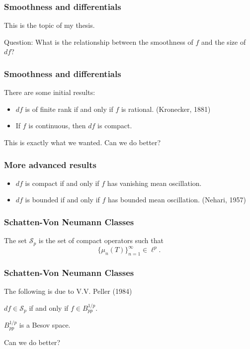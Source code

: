 \documentclass{beamer}
\begin{document}
\begin{frame}
\frametitle{Smoothness and differentials}
This is the topic of my thesis.
\begin{block}
    {Question:}
    What is the relationship between the smoothness of $f$
    and the size of $df$?    
\end{block}
\end{frame}

\begin{frame}
\frametitle{Smoothness and differentials}
There are some initial results:
\begin{itemize}
    \item{} $df$ is of finite rank if and only if $f$ is rational. (Kronecker, 1881)
    \item{} If $f$ is continuous, then $df$ is compact.
\end{itemize}
This is exactly what we wanted. Can we do better?
\end{frame}

\begin{frame}
\frametitle{More advanced results}
\begin{itemize}
    \item{} $df$ is compact if and only if $f$ has vanishing mean oscillation.
    \item{} $df$ is bounded if and only if $f$ has bounded mean oscillation. (Nehari, 1957)
\end{itemize}
\end{frame}

\begin{frame}
\frametitle{Schatten-Von Neumann Classes}
\begin{definition}
    The set $\mathcal{S}_p$ is the set of compact operators such that
    \begin{equation*}
        \{\mu_n(T)\}_{n=1}^\infty \in \ell^p.
    \end{equation*}
\end{definition}
\end{frame}

\begin{frame}
\frametitle{Schatten-Von Neumann Classes}
The following is due to V.V. Peller (1984)
\begin{theorem}
    $df \in \mathcal{S}_p$ if and only if $f \in B_{pp}^{1/p}$.
\end{theorem}
$B_{pp}^{1/p}$ is a Besov space.
\end{frame}

\begin{frame}
    Can we do better?
\end{frame}
\end{document}
